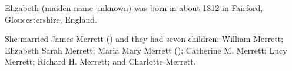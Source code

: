 
Elizabeth (maiden name unknown) was born in about 1812 in Fairford, Gloucestershire, England.\cite{Census1861Merrett}

She married James Merrett () and they had seven children:
William Merrett;
Elizabeth Sarah Merrett;
Maria Mary Merrett ();
Catherine M. Merrett;
Lucy Merrett;
Richard H. Merrett; and
Charlotte Merrett.
